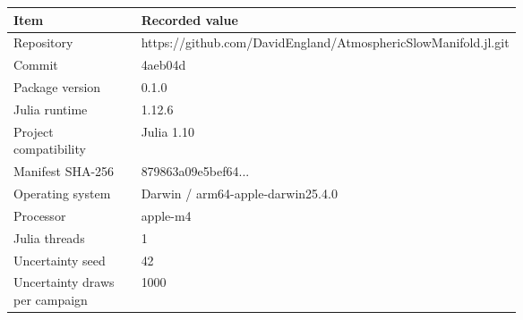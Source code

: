 \begin{tabular}{l p{0.66\linewidth}}
\toprule
Item & Recorded value \\
\midrule
Repository & https://github.com/DavidEngland/AtmosphericSlowManifold.jl.git \\
Commit & 4aeb04d \\
Package version & 0.1.0 \\
Julia runtime & 1.12.6 \\
Project compatibility & Julia 1.10 \\
Manifest SHA-256 & 879863a09e5bef64... \\
Operating system & Darwin / arm64-apple-darwin25.4.0 \\
Processor & apple-m4 \\
Julia threads & 1 \\
Uncertainty seed & 42 \\
Uncertainty draws per campaign & 1000 \\
\bottomrule
\end{tabular}
